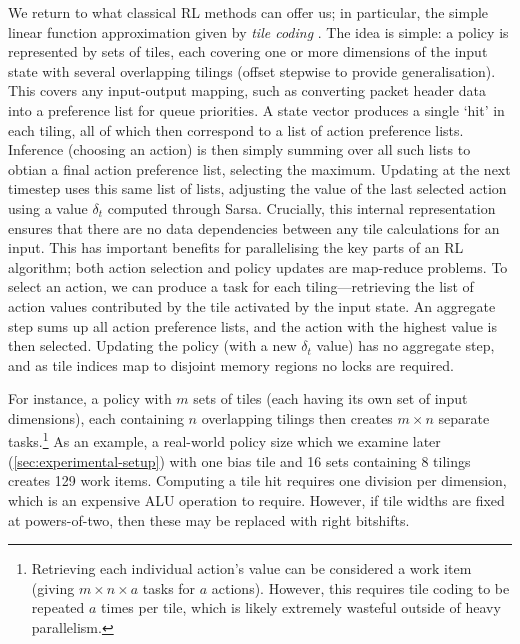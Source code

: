 \documentclass[
sigconf,natbib=false
]{acmart}
\begin{document}

We return to what classical RL methods can offer us; in particular, the simple linear function approximation given by \emph{tile coding} \cite[pp.\ \numrange{217}{221}]{RL2E}.
The idea is simple: a policy is represented by sets of tiles, each covering one or more dimensions of the input state with several overlapping tilings (offset stepwise to provide generalisation).
This covers any input-output mapping, such as converting packet header data into a preference list for queue priorities.
A state vector produces a single `hit' in each tiling, all of which then correspond to a list of action preference lists.
Inference (choosing an action) is then simply summing over all such lists to obtian a final action preference list, selecting the maximum.
Updating at the next timestep uses this same list of lists, adjusting the value of the last selected action using a value $\delta_t$ computed through Sarsa.
Crucially, this internal representation ensures that there are no data dependencies between any tile calculations for an input.
This has important benefits for parallelising the key parts of an RL algorithm; both action selection and policy updates are map-reduce problems.
To select an action, we can produce a task for each tiling---retrieving the list of action values contributed by the tile activated by the input state.
An aggregate step sums up all action preference lists, and the action with the highest value is then selected.
Updating the policy (with a new $\delta_t$ value) has no aggregate step, and as tile indices map to disjoint memory regions no locks are required.

For instance, a policy with $m$ sets of tiles (each having its own set of input dimensions), each containing $n$ overlapping tilings then creates $m \times n$ separate tasks.\footnote{Retrieving each individual action's value can be considered a work item (giving $m \times n \times a$ tasks for $a$ actions). However, this requires tile coding to be repeated $a$ times per tile, which is likely extremely wasteful outside of heavy parallelism.}
As an example, a real-world policy size which we examine later (\cref{sec:experimental-setup}) with one bias tile and \num{16} sets containing \num{8} tilings creates \num{129} work items.
Computing a tile hit requires one division per dimension, which is an expensive ALU operation to require.
However, if tile widths are fixed at powers-of-two, then these may be replaced with right bitshifts.
\end{document}
